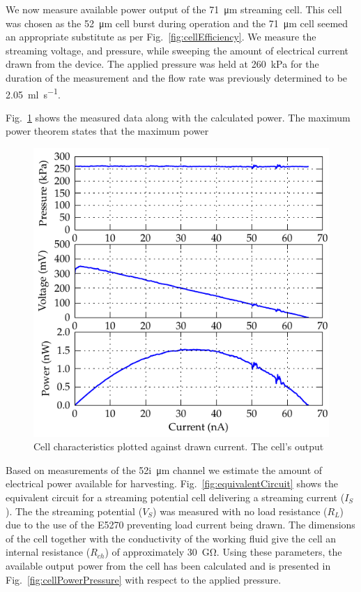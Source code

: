 \documentclass[10pt,final,journal]{IEEEtran}
\begin{document}
    We now measure available power output of the \SI{71}{\micro\meter} streaming cell.
    This cell was chosen as the \SI{52}{\micro\meter} cell burst during operation and the \SI{71}{\micro\meter} cell seemed an appropriate substitute as per Fig.~\ref{fig:cellEfficiency}.
    We measure the streaming voltage, and pressure, while sweeping the amount of electrical current drawn from the device.
    The applied pressure was held at \SI{260}{\kilo\pascal} for the duration of the measurement and the flow rate was previously determined to be \SI{2.05}{\milli\litre\per\second}.

    Fig.~\ref{fig:cellOutput} shows the measured data along with the calculated power.
    The maximum power theorem states that the maximum power


    \begin{figure}
        \begin{center}
        \includegraphics[width=\linewidth]{graph_cellOutput}
        \end{center}
        \caption{Cell characteristics plotted against drawn current.
        The cell's output }
        \label{fig:cellOutput}
    \end{figure}


    Based on measurements of the \SI{52i}{\micro\meter} channel we estimate the amount of electrical power available for harvesting.
    Fig.~\ref{fig:equivalentCircuit} shows the equivalent circuit for a streaming potential cell delivering a streaming current ($I_{S}$).
    The the streaming potential ($V_{S}$) was measured with no load resistance ($R_{L}$) due to the use of the E5270 preventing load current being drawn.
    The dimensions of the cell together with the conductivity of the working fluid give the cell an internal resistance ($R_{ch}$) of approximately \SI{30}{\giga\ohm}.
    Using these parameters, the available output power from the cell has been calculated and is presented in Fig.~\ref{fig:cellPowerPressure} with respect to the applied pressure.
\end{document}
